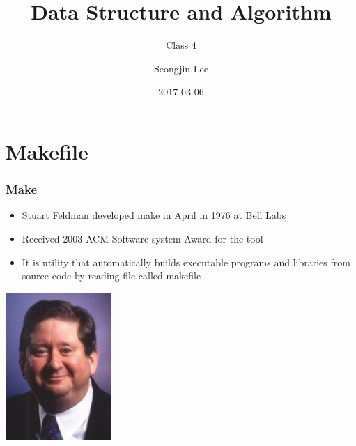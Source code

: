 \documentclass[newPxFont,sthlmFooter,nooffset]{beamer}
\title{Data Structure and Algorithm}
\subtitle{Class 4}
\author[SJL]{Seongjin Lee}
\institute{\href{mailto:insight@gnu.ac.kr}{insight@gnu.ac.kr}\\\url{http://resourceful.github.io}\\Systems Research Lab.\\GNU}
\date{2017-03-06}
\begin{document}
\frame[plain,t]{\titlepage} 



\section{Makefile} 
\begin{frame}[t]
  \frametitle{Make}

  \begin{itemize}
  \item Stuart Feldman developed make in April in 1976 at Bell Labs

  \item Received 2003 ACM Software system Award for the tool

  \item It is utility that automatically builds executable programs 
and libraries from source code by reading file called makefile

  \end{itemize}
  \begin{center}
    \includegraphics[width=0.3\textwidth]{figures/fig01_feldman.png}
  \end{center}

\end{frame}
\end{document}
